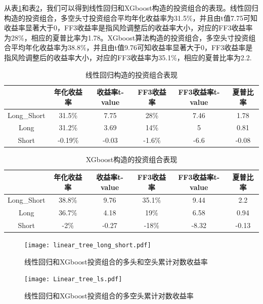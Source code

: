 \documentclass[12pt]{article} %
\begin{document}
	从表\ref{biao3}和表\ref{biao4}，我们可以得到线性回归和XGboost构造的投资组合的表现。线性回归构造的投资组合，多空头寸投资组合平均年化收益率为31.5\%，并且由t值7.75可知收益率显著大于0，FF3收益率是指风险调整后的收益率大小，对应的FF3收益率为28\%，相应的夏普比率为1.78。XGboost算法构造的投资组合，多空头寸投资组合平均年化收益率为38.8\%，并且由t值9.76可知收益率显著大于0，FF3收益率是指风险调整后的收益率大小，对应的FF3收益率为35.1\%，相应的夏普比率为2.2. 
	\begin{table}[ht]
		\small
		\caption{线性回归构造的投资组合表现}
		\label{biao3}
		\begin{tabular}{cccccc}
			\hline
			& 年化收益率   & 收益率t-value & FF3收益率 & FF3收益率t-value & 夏普比率  \\ \hline
			Long\_Short & 31.5\%  & 7.75       & 28\%   & 7.46          & 1.78  \\
			Long        & 31.2\%  & 3.69       & 14\%   & 5             & 0.81  \\
			Short       & -0.19\% & -0.03      & -1.6\% & -6.6          & -0.08 \\ \hline
		\end{tabular}
	\end{table}
	
	\begin{table}[ht]
		\small
		\caption{XGboost构造的投资组合表现}
		\label{biao4}
		\begin{tabular}{cccccc}
			\hline
			& 年化收益率  & 收益率t-value & FF3收益率 & FF3收益率t-value & 夏普比率  \\ \hline
			Long\_Short & 38.8\% & 9.76       & 35.1\% & 9.44          & 2.2   \\
			Long        & 36.7\% & 4.18       & 19\%   & 6.58          & 0.94  \\
			Short       & -2\%   & -0.27      & -18\%  & -8.32         & -0.13 \\ \hline
		\end{tabular}
	\end{table}
	
		\begin{figure}[ht]
		
		\centering
		\texttt{[image: linear\_tree\_long\_short.pdf]}
		\caption{线性回归和XGboost投资组合的多头和空头累计对数收益率}
		\label{linear_tree_long_short}
	\end{figure}
	
	\begin{figure}[ht]
		
		\centering
		\texttt{[image: Linear\_tree\_ls.pdf]}
		\caption{线性回归和XGboost投资组合的多空头累计对数收益率}
		\label{linear_tree_ls}
	\end{figure}
	
\end{document}

